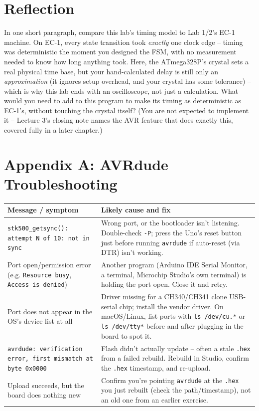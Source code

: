\documentclass[11pt]{article}
\begin{document}
\section*{Reflection}

In one short paragraph, compare this lab's timing model to Lab 1/2's EC-1 machine.
On EC-1, every state transition took \emph{exactly} one clock edge -- timing was
deterministic the moment you designed the FSM, with no measurement needed to know how
long anything took. Here, the ATmega328P's crystal sets a real physical time base,
but your hand-calculated delay is still only an \emph{approximation} (it ignores
setup overhead, and your crystal has some tolerance) -- which is why this lab ends
with an oscilloscope, not just a calculation. What would you need to add to this
program to make its timing as deterministic as EC-1's, without touching the crystal
itself? (You are not expected to implement it -- Lecture 3's closing note names the
AVR feature that does exactly this, covered fully in a later chapter.)

\newpage
\section*{Appendix A: AVRdude Troubleshooting}

\begin{center}
\begin{tabular}{@{}p{5.4cm}p{6.8cm}@{}}
\toprule
\textbf{Message / symptom} & \textbf{Likely cause and fix} \\
\midrule
\texttt{stk500\_getsync(): attempt N of 10: not in sync} &
Wrong port, or the bootloader isn't listening. Double-check \texttt{-P}; press the
Uno's reset button just before running \texttt{avrdude} if auto-reset (via DTR)
isn't working. \\
\addlinespace
Port open/permission error (e.g. \texttt{Resource busy}, \texttt{Access is denied}) &
Another program (Arduino IDE Serial Monitor, a terminal, Microchip Studio's own
terminal) is holding the port open. Close it and retry. \\
\addlinespace
Port does not appear in the OS's device list at all &
Driver missing for a CH340/CH341 clone USB-serial chip; install the vendor driver.
On macOS/Linux, list ports with \texttt{ls /dev/cu.*} or \texttt{ls /dev/tty*} before
and after plugging in the board to spot it. \\
\addlinespace
\texttt{avrdude: verification error, first mismatch at byte 0x0000} &
Flash didn't actually update -- often a stale \texttt{.hex} from a failed rebuild.
Rebuild in Studio, confirm the \texttt{.hex} timestamp, and re-upload. \\
\addlinespace
Upload succeeds, but the board does nothing new &
Confirm you're pointing \texttt{avrdude} at the \texttt{.hex} you just rebuilt (check
the path/timestamp), not an old one from an earlier exercise. \\
\bottomrule
\end{tabular}
\end{center}
\end{document}
